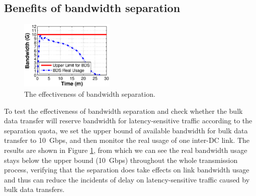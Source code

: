 \subsection{Benefits of bandwidth separation}
\label{subsec:evaluation:separation}
\begin{figure}[t]
  \centering
  \includegraphics[width=45mm]{images/Quota.eps}
  \caption{The effectiveness of bandwidth separation.}
  \label{fig:quota}
\end{figure}

To test the effectiveness of bandwidth separation and check whether the bulk data transfer will reserve bandwidth for latency-sensitive traffic according to the separation quota, we set the upper bound of available bandwidth for bulk data transfer to 10~Gbps, and then monitor the real usage of one inter-DC link. The results are shown in Figure \ref{fig:quota}, from which we can see the real bandwidth usage stays below the upper bound (10~Gbps) throughout the whole transmission process, verifying that the separation does take effects on link bandwidth usage and thus can reduce the incidents of delay on latency-sensitive traffic caused by bulk data transfers.

\begin{table}[t]
\begin{center}
\end{center}
\caption{Average link utilizations under \company and \name.}
\label{table:usage}
\vspace{-0.4cm}
\end{table}

